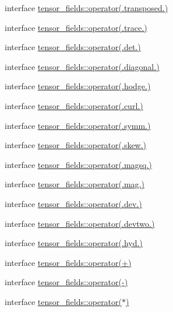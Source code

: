 \begin{DoxyCompactItemize}
interface \hyperlink{interfacetensor__fields_1_1operator_07_8transposed_8_08}{tensor\-\_\-fields\-::operator(.\-transposed.)}
\item 
interface \hyperlink{interfacetensor__fields_1_1operator_07_8trace_8_08}{tensor\-\_\-fields\-::operator(.\-trace.)}
\item 
interface \hyperlink{interfacetensor__fields_1_1operator_07_8det_8_08}{tensor\-\_\-fields\-::operator(.\-det.)}
\item 
interface \hyperlink{interfacetensor__fields_1_1operator_07_8diagonal_8_08}{tensor\-\_\-fields\-::operator(.\-diagonal.)}
\item 
interface \hyperlink{interfacetensor__fields_1_1operator_07_8hodge_8_08}{tensor\-\_\-fields\-::operator(.\-hodge.)}
\item 
interface \hyperlink{interfacetensor__fields_1_1operator_07_8curl_8_08}{tensor\-\_\-fields\-::operator(.\-curl.)}
\item 
interface \hyperlink{interfacetensor__fields_1_1operator_07_8symm_8_08}{tensor\-\_\-fields\-::operator(.\-symm.)}
\item 
interface \hyperlink{interfacetensor__fields_1_1operator_07_8skew_8_08}{tensor\-\_\-fields\-::operator(.\-skew.)}
\item 
interface \hyperlink{interfacetensor__fields_1_1operator_07_8magsq_8_08}{tensor\-\_\-fields\-::operator(.\-magsq.)}
\item 
interface \hyperlink{interfacetensor__fields_1_1operator_07_8mag_8_08}{tensor\-\_\-fields\-::operator(.\-mag.)}
\item 
interface \hyperlink{interfacetensor__fields_1_1operator_07_8dev_8_08}{tensor\-\_\-fields\-::operator(.\-dev.)}
\item 
interface \hyperlink{interfacetensor__fields_1_1operator_07_8devtwo_8_08}{tensor\-\_\-fields\-::operator(.\-devtwo.)}
\item 
interface \hyperlink{interfacetensor__fields_1_1operator_07_8hyd_8_08}{tensor\-\_\-fields\-::operator(.\-hyd.)}
\item 
interface \hyperlink{interfacetensor__fields_1_1operator_07_09_08}{tensor\-\_\-fields\-::operator(+)}
\item 
interface \hyperlink{interfacetensor__fields_1_1operator_07-_08}{tensor\-\_\-fields\-::operator(-\/)}
\item 
interface \hyperlink{interfacetensor__fields_1_1operator_07_5_08}{tensor\-\_\-fields\-::operator($\ast$)}
\end{DoxyCompactItemize}
